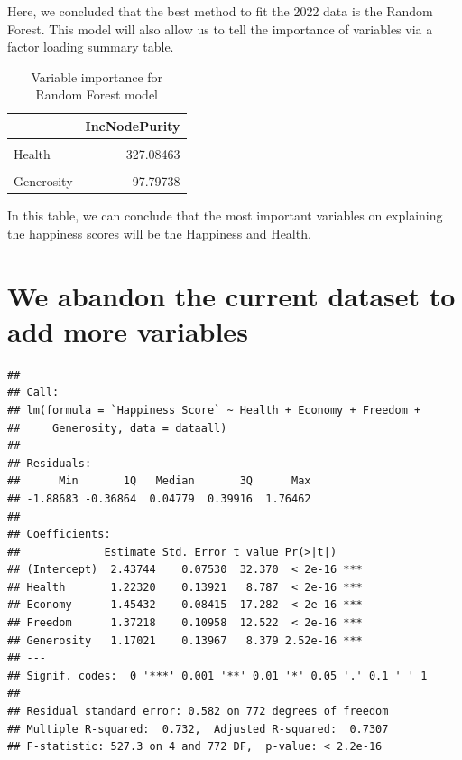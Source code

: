 \documentclass[11pt,a4paper,]{article}
\begin{document}
Here, we concluded that the best method to fit the 2022 data is the Random Forest. This model will also allow us to tell the importance of variables via a factor loading summary table.

\begin{table}

\caption{\label{tab:unnamed-chunk-8}Variable importance for Random Forest model}
\centering
\begin{tabular}[t]{l|r}
\hline
  & IncNodePurity\\
\hline
\cellcolor{gray!6}{Economy} & \cellcolor{gray!6}{348.66900}\\
\hline
Health & 327.08463\\
\hline
\cellcolor{gray!6}{Freedom} & \cellcolor{gray!6}{169.32991}\\
\hline
Generosity & 97.79738\\
\hline
\end{tabular}
\end{table}

In this table, we can conclude that the most important variables on explaining the happiness scores will be the Happiness and Health.

\hypertarget{we-abandon-the-current-dataset-to-add-more-variables}{%
\section{We abandon the current dataset to add more variables}\label{we-abandon-the-current-dataset-to-add-more-variables}}

\begin{verbatim}
## 
## Call:
## lm(formula = `Happiness Score` ~ Health + Economy + Freedom + 
##     Generosity, data = dataall)
## 
## Residuals:
##      Min       1Q   Median       3Q      Max 
## -1.88683 -0.36864  0.04779  0.39916  1.76462 
## 
## Coefficients:
##             Estimate Std. Error t value Pr(>|t|)    
## (Intercept)  2.43744    0.07530  32.370  < 2e-16 ***
## Health       1.22320    0.13921   8.787  < 2e-16 ***
## Economy      1.45432    0.08415  17.282  < 2e-16 ***
## Freedom      1.37218    0.10958  12.522  < 2e-16 ***
## Generosity   1.17021    0.13967   8.379 2.52e-16 ***
## ---
## Signif. codes:  0 '***' 0.001 '**' 0.01 '*' 0.05 '.' 0.1 ' ' 1
## 
## Residual standard error: 0.582 on 772 degrees of freedom
## Multiple R-squared:  0.732,  Adjusted R-squared:  0.7307 
## F-statistic: 527.3 on 4 and 772 DF,  p-value: < 2.2e-16
\end{verbatim}
\end{document}
